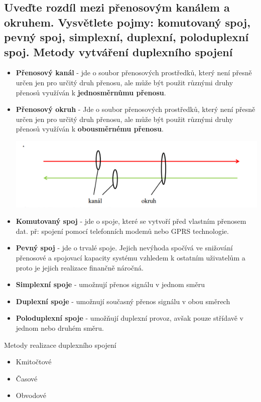\subsection{Uveďte rozdíl mezi přenosovým kanálem a okruhem. Vysvětlete pojmy: komutovaný spoj, pevný spoj, simplexní, duplexní, poloduplexní spoj. Metody vytváření duplexního spojení}
\begin{itemize}
    \item \textbf{Přenosový kanál} - jde o soubor přenosových prostředků, který není přesně určen jen pro určitý druh přenosu, ale může být použit různými druhy přenosů využíván k  \textbf{jednosměrnůmu přenosu}.

    \item \textbf{Přenosový okruh} - Jde o soubor přenosových prostředků, který není přesně určen jen pro určitý druh přenosu, ale může být použit různými druhy přenosů využíván k \textbf{obousměrnému přenosu}.
    
    \includegraphics[]{images/okruh_kanal.png}
    
    \item \textbf{Komutovaný spoj} - jde o spoje, které se vytvoří před vlastním přenosem dat. př: spojení pomocí telefonních modemů nebo GPRS technologie.
    \item \textbf{Pevný spoj} - jde o trvalé spoje. Jejich nevýhoda spočívá ve snižování přenosové a spojovací kapacity systému vzhledem k ostatním uživatelům a proto je jejich realizace finančně náročná.
    \item \textbf{Simplexní spoje} - umožnují přenos signálu v jednom směru
    \item \textbf{Duplexní spoje} - umožnují současný přenos signálu v obou směrech
    \item \textbf{Poloduplexní spoje} - umožňují duplexní provoz, avšak pouze střídavě v jednom nebo druhém směru.
\end{itemize}
Metody realizace duplexního spojení
\begin{itemize}
    \item Kmitočtové
    \item Časové
    \item Obvodové
\end{itemize}

